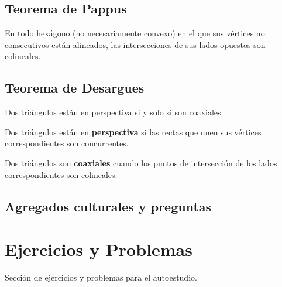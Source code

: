 \subsection{Teorema de Pappus}

\begin{section-theorem.tcb}
    En todo hexágono (no necesariamente convexo) en el que sus vértices no consecutivos están alineados, las intersecciones de sus lados opuestos son colineales.
\end{section-theorem.tcb}




\subsection{Teorema de Desargues}
\begin{section-theorem.tcb}
    Dos triángulos están en perspectiva si y solo si son coaxiales.
\end{section-theorem.tcb}

\begin{remark.tcb}
    Dos triángulos están en \textbf{perspectiva} si las rectas que unen sus vértices correspondientes son concurrentes.
\end{remark.tcb}

\begin{remark.tcb}
    Dos triángulos son \textbf{coaxiales} cuando los puntos de intersección de los lados correspondientes son colineales.
\end{remark.tcb}

\subsection{Agregados culturales y preguntas}






\section{Ejercicios y Problemas}
Sección de ejercicios y problemas para el autoestudio.